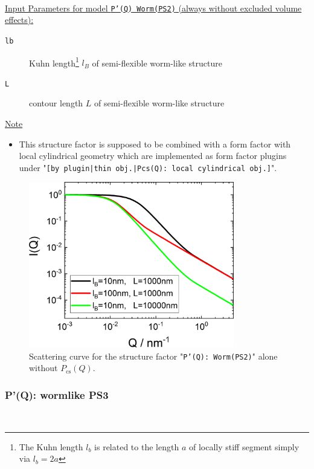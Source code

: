 \hspace{1pt}\\
\underline{Input Parameters for model \texttt{P'(Q) Worm(PS2)} (always without excluded volume effects):}\\
\begin{description}
\item[\texttt{lb}] Kuhn length\footnote{The Kuhn length $l_b$ is related to the length $a$ of
    locally stiff segment simply via $l_b=2a$} $l_B$ of semi-flexible worm-like structure
\item[\texttt{L}] contour length $L$ of semi-flexible worm-like structure
\end{description}

\noindent
\underline{Note}
\begin{itemize}
  \item This structure factor is supposed to be combined with a form factor with local cylindrical geometry which are implemented as form factor plugins
under "\texttt{[by plugin|thin obj.|Pcs(Q): local cylindrical obj.]}".
\end{itemize}

\begin{figure}[htb]
\begin{center}
\includegraphics[width=0.8\textwidth]{../images/form_factor/polymer_semiflexible/PprimeWormPS2.png}
\end{center}
\caption{Scattering curve for the structure factor "\texttt{P'(Q): Worm(PS2)}" alone without $P_\mathrm{cs}(Q)$.}
\label{fig_IQ:PprimeWormPS2}
\end{figure}

\clearpage
\subsubsection{P'(Q): wormlike PS3} ~\\
\label{plugin:Pprime4wormPS3}

